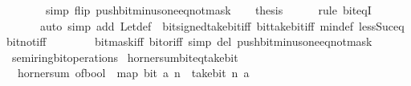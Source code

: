 \begin{isabellebody}
\ \ \ \ \ \ \ simp\ flip{\isacharcolon}{\kern0pt}\ push{\isacharunderscore}{\kern0pt}bit{\isacharunderscore}{\kern0pt}minus{\isacharunderscore}{\kern0pt}one{\isacharunderscore}{\kern0pt}eq{\isacharunderscore}{\kern0pt}not{\isacharunderscore}{\kern0pt}mask{\isacharparenright}{\kern0pt}\isanewline
\ \ \isamarkupfalse%
\ {\isacharquery}{\kern0pt}thesis\isanewline
\ \ \ \ \isamarkupfalse%
\ {\isacharparenleft}{\kern0pt}rule\ bit{\isacharunderscore}{\kern0pt}eqI{\isacharparenright}{\kern0pt}\isanewline
\ \ \ \ \ \ {\isacharparenleft}{\kern0pt}auto\ simp\ add{\isacharcolon}{\kern0pt}\ Let{\isacharunderscore}{\kern0pt}def\ {\isacharasterisk}{\kern0pt}\ bit{\isacharunderscore}{\kern0pt}signed{\isacharunderscore}{\kern0pt}take{\isacharunderscore}{\kern0pt}bit{\isacharunderscore}{\kern0pt}iff\ bit{\isacharunderscore}{\kern0pt}take{\isacharunderscore}{\kern0pt}bit{\isacharunderscore}{\kern0pt}iff\ min{\isacharunderscore}{\kern0pt}def\ less{\isacharunderscore}{\kern0pt}Suc{\isacharunderscore}{\kern0pt}eq\ bit{\isacharunderscore}{\kern0pt}not{\isacharunderscore}{\kern0pt}iff\isanewline
\ \ \ \ \ \ \ \ bit{\isacharunderscore}{\kern0pt}mask{\isacharunderscore}{\kern0pt}iff\ bit{\isacharunderscore}{\kern0pt}or{\isacharunderscore}{\kern0pt}iff\ simp\ del{\isacharcolon}{\kern0pt}\ push{\isacharunderscore}{\kern0pt}bit{\isacharunderscore}{\kern0pt}minus{\isacharunderscore}{\kern0pt}one{\isacharunderscore}{\kern0pt}eq{\isacharunderscore}{\kern0pt}not{\isacharunderscore}{\kern0pt}mask{\isacharparenright}{\kern0pt}\isanewline
{}\isamarkupfalse%
%
\endisatagproof
{\isafoldproof}%
%
\isadelimproof
%
\endisadelimproof
%
\isadelimdocument
%
\endisadelimdocument
%
\isatagdocument
%
\isamarkuptrue%
%
\endisatagdocument
{\isafolddocument}%
%
\isadelimdocument
%
\endisadelimdocument
{}\isamarkupfalse%
\ semiring{\isacharunderscore}{\kern0pt}bit{\isacharunderscore}{\kern0pt}operations\isanewline
{}\isanewline
\isanewline
{}\isamarkupfalse%
\ horner{\isacharunderscore}{\kern0pt}sum{\isacharunderscore}{\kern0pt}bit{\isacharunderscore}{\kern0pt}eq{\isacharunderscore}{\kern0pt}take{\isacharunderscore}{\kern0pt}bit{\isacharcolon}{\kern0pt}\isanewline
\ \ {\isacartoucheopen}horner{\isacharunderscore}{\kern0pt}sum\ of{\isacharunderscore}{\kern0pt}bool\ {}\ {\isacharparenleft}{\kern0pt}map\ {\isacharparenleft}{\kern0pt}bit\ a{\isacharparenright}{\kern0pt}\ {\isacharbrackleft}{\kern0pt}{}{\isachardot}{\kern0pt}{\isachardot}{\kern0pt}{\isacharless}{\kern0pt}n{\isacharbrackright}{\kern0pt}{\isacharparenright}{\kern0pt}\ {\isacharequal}{\kern0pt}\ take{\isacharunderscore}{\kern0pt}bit\ n\ a{\isacartoucheclose}\isanewline

\end{isabellebody}
